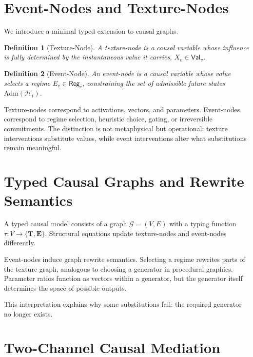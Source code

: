 \documentclass[11pt]{article}
\newtheorem{definition}{Definition}
\theoremstyle{remark}
\newcommand{\Adm}{\mathrm{Adm}}
\newcommand{\Hist}{\mathcal{H}}
\newcommand{\Val}{\mathsf{Val}}
\newcommand{\Reg}{\mathsf{Reg}}
\newcommand{\Tnode}{\mathbf{T}}
\newcommand{\Enode}{\mathbf{E}}
\newcommand{\Graph}{\mathcal{G}}
\begin{document}
\section{Event-Nodes and Texture-Nodes}

We introduce a minimal typed extension to causal graphs.

\begin{definition}[Texture-Node]
A texture-node is a causal variable whose influence is fully determined by the instantaneous value it carries, $X_v \in \Val_v$.
\end{definition}

\begin{definition}[Event-Node]
An event-node is a causal variable whose value selects a regime $E_v \in \Reg_v$, constraining the set of admissible future states $\Adm(\Hist_t)$.
\end{definition}

Texture-nodes correspond to activations, vectors, and parameters. Event-nodes correspond to regime selection, heuristic choice, gating, or irreversible commitments. The distinction is not metaphysical but operational: texture interventions substitute values, while event interventions alter what substitutions remain meaningful.

\section{Typed Causal Graphs and Rewrite Semantics}

A typed causal model consists of a graph $\Graph = (V,E)$ with a typing function $\tau: V \to \{\Tnode, \Enode\}$. Structural equations update texture-nodes and event-nodes differently.

Event-nodes induce graph rewrite semantics. Selecting a regime rewrites parts of the texture graph, analogous to choosing a generator in procedural graphics. Parameter ratios function as vectors within a generator, but the generator itself determines the space of possible outputs.

This interpretation explains why some substitutions fail: the required generator no longer exists.

\section{Two-Channel Causal Mediation}
\end{document}
